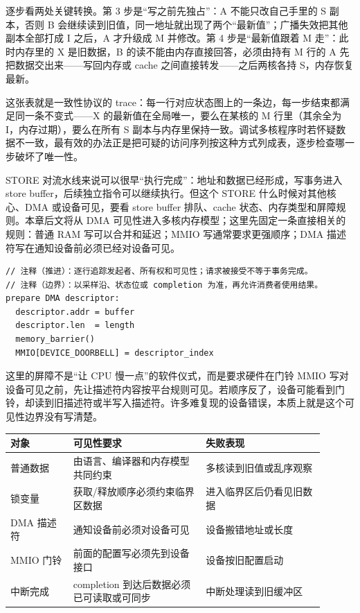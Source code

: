 逐步看两处关键转换。第 3 步是“写之前先独占”：A 不能只改自己手里的 S 副本，否则 B 会继续读到旧值，同一地址就出现了两个“最新值”；广播失效把其他副本全部打成 I 之后，A 才升级成 M 并修改。第 4 步是“最新值跟着 M 走”：此时内存里的 X 是旧数据，B 的读不能由内存直接回答，必须由持有 M 行的 A 先把数据交出来——写回内存或 cache 之间直接转发——之后两核各持 S，内存恢复最新。

这张表就是一致性协议的 trace：每一行对应状态图上的一条边，每一步结束都满足同一条不变式——X 的最新值在全局唯一，要么在某核的 M 行里（其余全为 I，内存过期），要么在所有 S 副本与内存里保持一致。调试多核程序时若怀疑数据不一致，最有效的办法正是把可疑的访问序列按这种方式列成表，逐步检查哪一步破坏了唯一性。

STORE 对流水线来说可以很早“执行完成”：地址和数据已经形成，写事务进入 store buffer，后续独立指令可以继续执行。但这个 STORE 什么时候对其他核心、DMA 或设备可见，要看 store buffer 排队、cache 状态、内存类型和屏障规则。本章后文将从 DMA 可见性进入多核内存模型；这里先固定一条直接相关的规则：普通 RAM 写可以合并和延迟；MMIO 写通常要求更强顺序；DMA 描述符写在通知设备前必须已经对设备可见。

\begin{lstlisting}
// 注释（推进）：逐行追踪发起者、所有权和可见性；请求被接受不等于事务完成。
// 注释（边界）：以采样沿、状态位或 completion 为准，再允许消费者使用结果。
prepare DMA descriptor:
  descriptor.addr = buffer
  descriptor.len  = length
  memory_barrier()
  MMIO[DEVICE_DOORBELL] = descriptor_index
\end{lstlisting}

这里的屏障不是“让 CPU 慢一点”的软件仪式，而是要求硬件在门铃 MMIO 写对设备可见之前，先让描述符内容按平台规则可见。若顺序反了，设备可能看到门铃，却读到旧描述符或半写入描述符。许多难复现的设备错误，本质上就是这个可见性边界没有写清楚。

\begin{longtable}{L{0.18\linewidth}L{0.38\linewidth}L{0.34\linewidth}}
\toprule
对象 & 可见性要求 & 失败表现 \\
\midrule
普通数据 & 由语言、编译器和内存模型共同约束 & 多核读到旧值或乱序观察 \\\tablerowrule
锁变量 & 获取/释放顺序必须约束临界区数据 & 进入临界区后仍看见旧数据 \\\tablerowrule
DMA 描述符 & 通知设备前必须对设备可见 & 设备搬错地址或长度 \\\tablerowrule
MMIO 门铃 & 前面的配置写必须先到设备接口 & 设备按旧配置启动 \\\tablerowrule
中断完成 & completion 到达后数据必须已可读取或可同步 & 中断处理读到旧缓冲区 \\
\bottomrule
\end{longtable}

